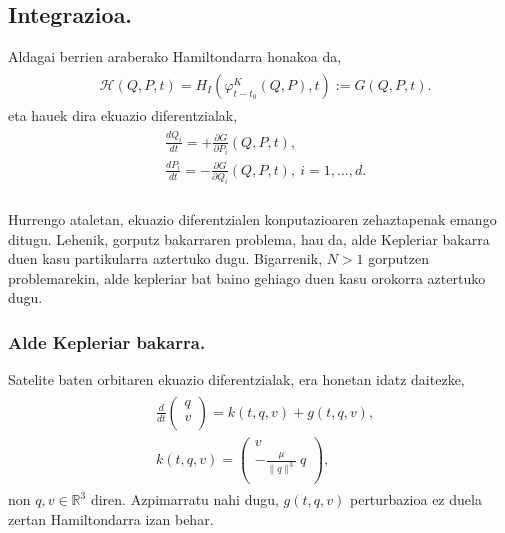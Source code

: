 \subsection*{Integrazioa.}
Aldagai berrien araberako Hamiltondarra honakoa da,
\begin{align}
\begin{split}
&\mathcal{H}(Q,P,t)=H_I (\varphi_{t-t_0}^K(Q,P),t):=G (Q,P,t).
\end{split}
\end{align}
eta hauek dira ekuazio diferentzialak,
\begin{align}
\begin{split}
&\frac{d Q_i}{dt}= +\frac{\partial G}{\partial P_i} (Q,P,t),\\
&\frac{d P_i}{dt}= -\frac{\partial G}{\partial Q_i} (Q,P,t), \ i=1,\dots,d.\\
\end{split}
\end{align}


Hurrengo ataletan, ekuazio diferentzialen konputazioaren zehaztapenak emango ditugu. Lehenik, gorputz bakarraren problema, hau da, alde Kepleriar bakarra duen kasu partikularra aztertuko dugu. Bigarrenik, $N>1$ gorputzen problemarekin, alde kepleriar bat baino gehiago duen kasu orokorra aztertuko dugu. 

\subsubsection{Alde Kepleriar bakarra.}

Satelite baten orbitaren ekuazio diferentzialak, era honetan idatz daitezke,
\begin{align}
\begin{split}
&\frac{d}{dt}\left(\begin{array}{c}
                q  \\
                v  \\
\end{array}\right)
= k(t,q,v)         
+ g(t,q,v), \\
&k(t,q,v)=\left(\begin{array}{c}
                 v \\
                -\frac{\mu}{\|q\|^3} \ q\\
\end{array}\right),
\end{split}
\end{align}
non $q,v \in \mathbb{R}^3$ diren. Azpimarratu nahi dugu, $g(t,q,v)$ perturbazioa ez duela zertan Hamiltondarra izan behar.

